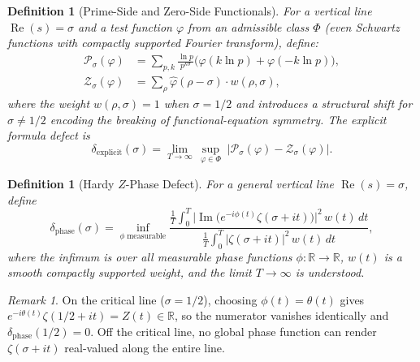 \documentclass[11pt]{article}
\newtheorem{definition}[theorem]{Definition}
\theoremstyle{remark}
\newtheorem{remark}[theorem]{Remark}
\DeclareMathOperator{\Ima}{Im}
\DeclareMathOperator{\Rea}{Re}
\begin{document}
\begin{definition}[Prime-Side and Zero-Side Functionals]
\label{def:functionals}
For a vertical line $\Rea(s)=\sigma$ and a test function $\varphi$ from an admissible
class $\Phi$ (even Schwartz functions with compactly supported Fourier transform), define:
\begin{align}
  \mathcal{P}_\sigma(\varphi) &= \sum_{p,k} \frac{\ln p}{p^{k\sigma}}
    \bigl(\varphi(k\ln p)+\varphi(-k\ln p)\bigr), \label{eq:P-sigma}\\
  \mathcal{Z}_\sigma(\varphi) &= \sum_{\rho} \hat{\varphi}(\rho-\sigma)\cdot w(\rho,\sigma),
    \label{eq:Z-sigma}
\end{align}
where the weight $w(\rho,\sigma)=1$ when $\sigma=1/2$ and introduces a structural shift
for $\sigma\neq 1/2$ encoding the breaking of functional-equation symmetry.
The \emph{explicit formula defect} is
\begin{equation}\label{eq:delta-explicit}
  \delta_{\mathrm{explicit}}(\sigma) = \lim_{T\to\infty}\,
  \sup_{\varphi\in\Phi}\;
  |\mathcal{P}_\sigma(\varphi)-\mathcal{Z}_\sigma(\varphi)|.
\end{equation}
\end{definition}

\begin{definition}[Hardy $Z$-Phase Defect]
\label{def:phase-defect}
For a general vertical line $\Rea(s)=\sigma$, define
\begin{equation}\label{eq:delta-phase}
  \delta_{\mathrm{phase}}(\sigma) = \inf_{\phi\;\mathrm{measurable}}
  \frac{\displaystyle\frac{1}{T}\int_0^T
    \bigl|\Ima\bigl(e^{-i\phi(t)}\zeta(\sigma+it)\bigr)\bigr|^2\,w(t)\,dt}
  {\displaystyle\frac{1}{T}\int_0^T |\zeta(\sigma+it)|^2\,w(t)\,dt},
\end{equation}
where the infimum is over all measurable phase functions $\phi\colon\mathbb{R}\to\mathbb{R}$,
$w(t)$ is a smooth compactly supported weight, and the limit $T\to\infty$ is understood.
\end{definition}

\begin{remark}
On the critical line ($\sigma=1/2$), choosing $\phi(t)=\theta(t)$ gives
$e^{-i\theta(t)}\zeta(1/2+it)=Z(t)\in\mathbb{R}$, so the numerator vanishes identically
and $\delta_{\mathrm{phase}}(1/2)=0$.
Off the critical line, no global phase function can render $\zeta(\sigma+it)$ real-valued
along the entire line.
\end{remark}

\end{document}
